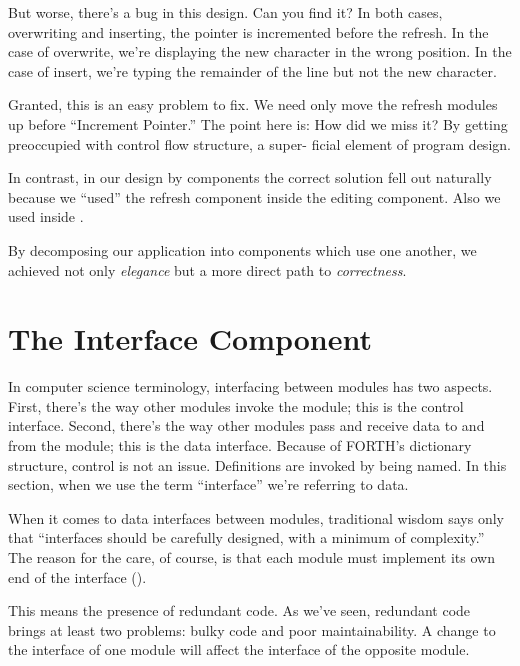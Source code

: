 But worse, there's a bug in this design. Can you find it?  In both
cases, overwriting and inserting, the pointer is incremented before
the refresh. In the case of overwrite, we're displaying the new
character in the wrong position. In the case of insert, we're typing
the remainder of the line but not the new character.

Granted, this is an easy problem to fix. We need only move the refresh
modules up before ``Increment Pointer.'' The point here is: How did
we miss it? By getting preoccupied with control flow structure, a super-
ficial element of program design.



In contrast, in our design by components the correct solution fell
out naturally because we ``used'' the refresh component inside the editing
component. Also we used  inside .

By decomposing our application into components which use one another,
we achieved not only \emph{elegance} but a more direct path to
\emph{correctness}.

\section{The Interface Component}

In computer science terminology, interfacing between modules has two
aspects. First, there's the way other modules invoke the module; this is
the control interface. Second, there's the way other modules pass and
receive data to and from the module; this is the data interface.
Because of FORTH's dictionary structure, control is not an issue.
Definitions are invoked by being named. In this section, when we use the
term ``interface'' we're referring to data.

When it comes to data interfaces between modules, traditional wisdom
says only that ``interfaces should be carefully designed, with a
minimum of complexity.'' The reason for the care, of course, is that
each module must implement its own end of the interface ().

This means the presence of redundant code. As we've seen, redundant
code brings at least two problems: bulky code and poor maintainability.
A change to the interface of one module will affect the interface
of the opposite module.


